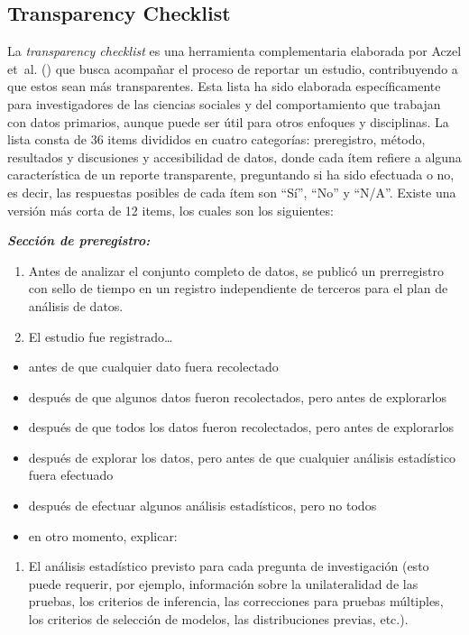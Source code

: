 \documentclass[
  spanish,
  a4paper,
  oneside]{scrbook}
\providecommand{\tightlist}{%
  \setlength{\itemsep}{0pt}\setlength{\parskip}{0pt}}
\begin{document}
\subsection{Transparency Checklist}\label{transparency-checklist}

La \emph{transparency checklist} es una herramienta complementaria
elaborada por Aczel et~al.
() que busca acompañar el
proceso de reportar un estudio, contribuyendo a que estos sean más
transparentes. Esta lista ha sido elaborada específicamente para
investigadores de las ciencias sociales y del comportamiento que
trabajan con datos primarios, aunque puede ser útil para otros enfoques
y disciplinas. La lista consta de 36 items divididos en cuatro
categorías: preregistro, método, resultados y discusiones y
accesibilidad de datos, donde cada ítem refiere a alguna característica
de un reporte transparente, preguntando si ha sido efectuada o no, es
decir, las respuestas posibles de cada ítem son ``Sí'', ``No'' y
``N/A''. Existe una versión más corta de 12 items, los cuales son los
siguientes:

\textbf{\emph{Sección de preregistro:}}

\begin{enumerate}
\def\labelenumi{(\arabic{enumi})}
\item
  Antes de analizar el conjunto completo de datos, se publicó un
  prerregistro con sello de tiempo en un registro independiente de
  terceros para el plan de análisis de datos.
\item
  El estudio fue registrado\ldots{}
\end{enumerate}

\begin{itemize}
\tightlist
\item
  antes de que cualquier dato fuera recolectado
\item
  después de que algunos datos fueron recolectados, pero antes de
  explorarlos
\item
  después de que todos los datos fueron recolectados, pero antes de
  explorarlos
\item
  después de explorar los datos, pero antes de que cualquier análisis
  estadístico fuera efectuado
\item
  después de efectuar algunos análisis estadísticos, pero no todos
\item
  en otro momento, explicar:
\end{itemize}

\begin{enumerate}
\def\labelenumi{(\arabic{enumi})}
\setcounter{enumi}{2}
\tightlist
\item
  El análisis estadístico previsto para cada pregunta de investigación
  (esto puede requerir, por ejemplo, información sobre la unilateralidad
  de las pruebas, los criterios de inferencia, las correcciones para
  pruebas múltiples, los criterios de selección de modelos, las
  distribuciones previas, etc.).
\end{enumerate}
\end{document}
